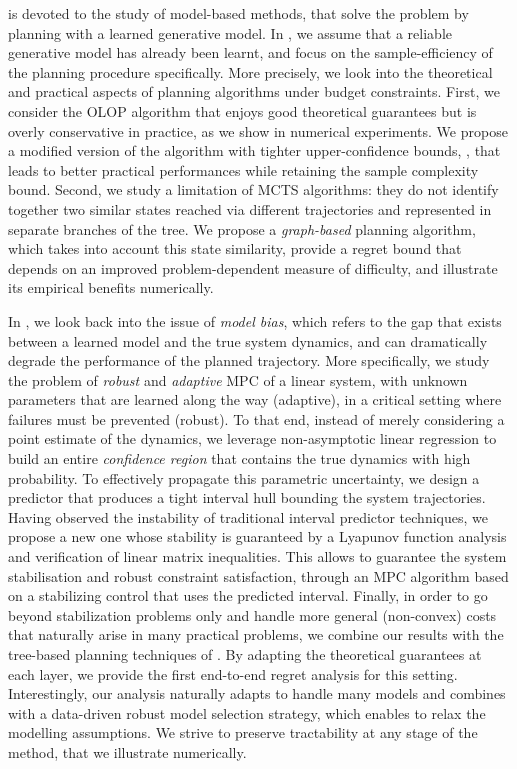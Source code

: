 \textbf{} is devoted to the study of model-based methods, that solve the  problem by planning with a learned generative model.
In \textbf{}, we assume that a reliable generative model has already been learnt, and focus on the sample-efficiency of the planning procedure specifically. More precisely, we look into the theoretical and practical aspects of planning algorithms under budget constraints. First, we consider the \gls{OLOP} algorithm that enjoys good theoretical guarantees but is overly conservative in practice, as we show in numerical experiments. We propose a modified version of the algorithm with tighter upper-confidence bounds, \KLOLOP, that leads to better practical performances while retaining the sample complexity bound. Second, we study a limitation of \gls{MCTS} algorithms: they do not identify together two similar states reached via different trajectories and represented in separate branches of the tree. We propose a \emph{graph-based} planning algorithm, which takes into account this state similarity, provide a regret bound that depends on an improved problem-dependent measure of difficulty, and illustrate its empirical benefits numerically.

In \textbf{}, we look back into the issue of \emph{model bias}, which refers to the gap that exists between a learned model and the true system dynamics, and can dramatically degrade the performance of the planned trajectory. More specifically, we study the problem of \emph{robust} and \emph{adaptive} \gls{MPC} of a linear system, with unknown parameters that are learned along the way (adaptive), in a critical setting where failures must be prevented (robust).
To that end, instead of merely considering a point estimate of the dynamics, we leverage non-asymptotic linear regression to build an entire \emph{confidence region} that contains the true dynamics with high probability.
To effectively propagate this parametric uncertainty, we design a predictor that produces a tight interval hull bounding the system trajectories. Having observed the instability of traditional interval predictor techniques, we propose a new one whose stability is guaranteed by a Lyapunov function analysis and verification of linear matrix inequalities.
This allows to guarantee the system stabilisation and robust constraint satisfaction, through an \gls{MPC} algorithm based on a stabilizing control that uses the predicted interval.
Finally, in order to go beyond stabilization problems only and handle more general (non-convex) costs that naturally arise in many practical problems, we combine our results with the tree-based planning techniques of . By adapting the theoretical guarantees at each layer, we provide the first end-to-end regret analysis for this setting. Interestingly, our analysis naturally adapts to handle many models and combines with a data-driven robust model selection strategy, which enables to relax the modelling assumptions. We strive to preserve tractability at any stage of the method, that we illustrate numerically.

